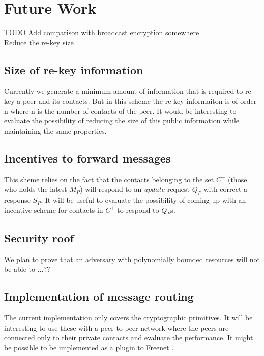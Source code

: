 \section{Future Work}

TODO Add comparison with broadcast encryption somewhere\\

Reduce the re-key size\\
\subsection{Size of re-key information}
Currently we generate a minimum amount of information that is required to re-key a peer and its contacts. But in this scheme the re-key informaiton is of order n where n is the number of contacts of the peer. It would be interesting to evaluate the possibility of reducing the size of this public information while maintaining the same properties.

\subsection{Incentives to forward messages}
This sheme relies on the fact that the contacts belonging to the set $C^+$ (those who holds the latest $M_P$) will respond to an $update$ request $Q_P$ with correct a response $S_P$. It will be useful to evaluate the possibility of coming up with an incentive scheme for contacts in $C^+$ to respond to $Q_P$s.

\subsection{Security roof}
We plan to prove that an adversary with polynomially bounded resources will not be able to ...??

\subsection{Implementation of message routing}
The current implementation only covers the cryptographic primitives. It will be interesting to use these with a peer to peer network where the peers are connected only to their private contacts and evaluate the performance. It might be possible to be implemented as a plugin to Freenet \cite{freenet}.

